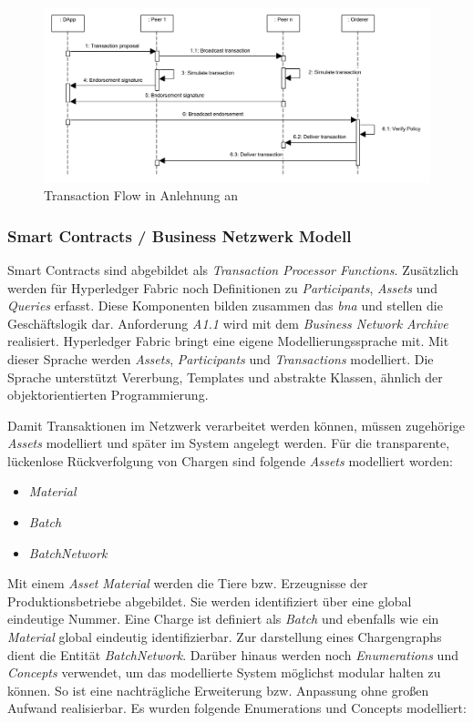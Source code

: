 \begin{figure}[H]
	\centering
	\includegraphics[width=1\linewidth]{pictures/transaction-flow}
	\caption[Transaction Flow]{Transaction Flow in Anlehnung an \citep{Choudhury2018}}
	\label{fig:transaction-flow}
\end{figure}

\subsubsection{Smart Contracts / Business Netzwerk Modell}\label{smart-contracts}
Smart Contracts sind abgebildet als \textit{Transaction Processor Functions}. Zusätzlich werden für Hyperledger Fabric noch Definitionen zu \textit{Participants}, \textit{Assets} und \textit{Queries} erfasst. Diese Komponenten bilden zusammen das \textit{\ac{bna}} und stellen die Geschäftslogik dar. Anforderung \textit{A1.1} wird mit dem \textit{Business Network Archive} realisiert. Hyperledger Fabric bringt eine eigene Modellierungssprache mit. Mit dieser Sprache werden \textit{Assets}, \textit{Participants} und \textit{Transactions} modelliert. Die Sprache unterstützt Vererbung, Templates und abstrakte Klassen, ähnlich der objektorientierten Programmierung.

Damit Transaktionen im Netzwerk verarbeitet werden können, müssen zugehörige \textit{Assets} modelliert und später im System angelegt werden. Für die transparente, lückenlose Rückverfolgung von Chargen sind folgende \textit{Assets} modelliert worden:

\begin{itemize}
	\item \textit{Material}
	\item \textit{Batch}
	\item \textit{BatchNetwork}
\end{itemize}

Mit einem \textit{Asset} \textit{Material} werden die Tiere bzw. Erzeugnisse der Produktionsbetriebe abgebildet. Sie werden identifiziert über eine global eindeutige Nummer. Eine Charge ist definiert als \textit{Batch} und ebenfalls wie ein \textit{Material} global eindeutig identifizierbar. Zur darstellung eines Chargengraphs dient die Entität \textit{BatchNetwork}. Darüber hinaus werden noch \textit{Enumerations} und \textit{Concepts} verwendet, um das modellierte System möglichst modular halten zu können. So ist eine nachträgliche Erweiterung bzw. Anpassung ohne großen Aufwand realisierbar. Es wurden folgende Enumerations und Concepts modelliert:

